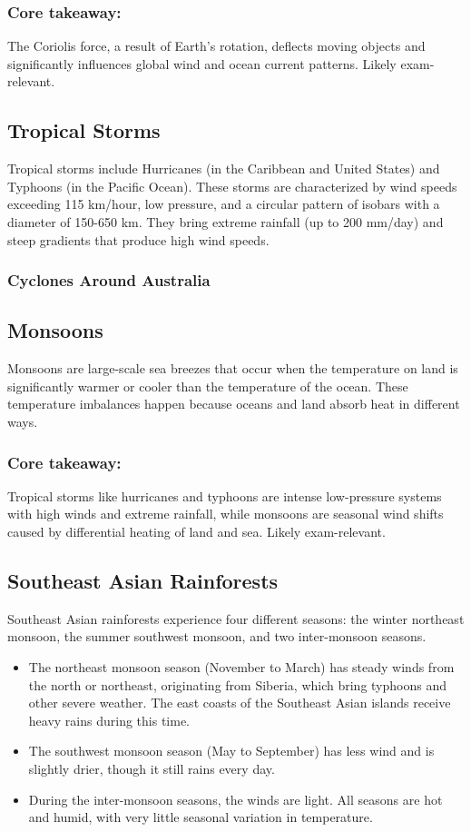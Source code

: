 \subsubsection*{Core takeaway: }
The Coriolis force, a result of Earth's rotation, deflects moving objects and significantly influences global wind and ocean current patterns. Likely exam-relevant.


\subsection{Tropical Storms} 
Tropical storms include Hurricanes (in the Caribbean and United States) and Typhoons (in the Pacific Ocean). These storms are characterized by wind speeds exceeding 115 km/hour, low pressure, and a circular pattern of isobars with a diameter of 150-650 km. They bring extreme rainfall (up to 200 mm/day) and steep gradients that produce high wind speeds. 

\subsubsection*{Cyclones Around Australia}
\subsection{Monsoons} 
Monsoons are large-scale sea breezes that occur when the temperature on land is significantly warmer or cooler than the temperature of the ocean. These temperature imbalances happen because oceans and land absorb heat in different ways.

\subsubsection*{Core takeaway:} 
Tropical storms like hurricanes and typhoons are intense low-pressure systems with high winds and extreme rainfall, while monsoons are seasonal wind shifts caused by differential heating of land and sea. Likely exam-relevant.


\subsection{Southeast Asian Rainforests} 
Southeast Asian rainforests experience four different seasons: the winter northeast monsoon, the summer southwest monsoon, and two inter-monsoon seasons. 

\begin{itemize} 
    \item The northeast monsoon season (November to March) has steady winds from the north or northeast, originating from Siberia, which bring typhoons and other severe weather. The east coasts of the Southeast Asian islands receive heavy rains during this time. 
    \item The southwest monsoon season (May to September) has less wind and is slightly drier, though it still rains every day. 
    \item During the inter-monsoon seasons, the winds are light. All seasons are hot and humid, with very little seasonal variation in temperature. 
\end{itemize}

